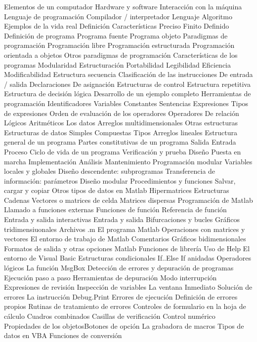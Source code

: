 Elementos de un computador
Hardware y software
Interacción con la máquina
Lenguaje de programación
Compilador / interpretador
Lenguaje
Algoritmo
Ejemplos de la vida real
Definición
Características
Preciso
Finito
Definido
Definición de programa
Programa fuente
Programa objeto
Paradigmas de programación
Programación libre
Programación estructurada
Programación orientada a objetos
Otros paradigmas de programación
Características de los programas
Modularidad
Estructuración
Portabilidad
Legibilidad
Eficiencia
Modificabilidad
Estructura secuencia
Clasificación de las instrucciones
De entrada / salida
Declaraciones
De asignación
Estructuras de control
Estructura repetitiva
Estructura de decisión lógica
Desarrollo de un ejemplo completo
Herramientas de programación
Identificadores
Variables
Constantes
Sentencias
Expresiones
Tipos de expresiones
Orden de evaluación de los operadores
Operadores
De relación
Lógicos
Aritméticos
Los datos
Arreglos multidimensionales
Otras estructuras
Estructuras de datos
Simples
Compuestas
Tipos
Arreglos lineales
Estructura general de un programa
Partes constitutivas de un programa
Salida
Entrada
Proceso
Ciclo de vida de un programa
Verificación y prueba
Diseño
Puesta en marcha
Implementación
Análisis
Mantenimiento
Programación modular
Variables locales y globales
Diseño descendente: subprogramas
Transferencia de información: parámetros
Diseño modular
Procedimientos y funciones
Salvar, cargar y copiar
Otros tipos de datos en Matlab
Hipermatrices
Estructuras
Cadenas
Vectores o matrices de celda
Matrices dispersas
Programación de Matlab
Llamado a funciones externas
Funciones de función
Referencia de función
Entrada y salida interactivas
Entrada y salida
Bifurcaciones y bucles
Gráficos tridimensiuonales
Archivos .m
El programa Matlab
Operaciones con matrices y vectores
El entorno de trabajo de Matlab
Comentarios
Gráficos bidimensionales
Formatos de salida y otras opciones Matlab
Funciones de librería
Uso de Help
El entorno de Visual Basic
Estructuras condicionales If..Else
If anidadas
Operadores lógicos
La función MsgBox
Detección de errores y depuración de programas
Ejecución paso a paso
Herramientas de depuración
Modo interrupción
Expresiones de revisión
Inspección de variables
La ventana Inmediato
Solución de errores
La instrucción Debug.Print
Errores de ejecución
Definición de errores propios
Rutinas de tratamiento de errores
Controles de formulario en la hoja de cálculo
Cuadros combinados
Casillas de verificación
Control numérico
Propiedades de los objetosBotones de opción
La grabadora de macros
Tipos de datos en VBA
Funciones de conversión

